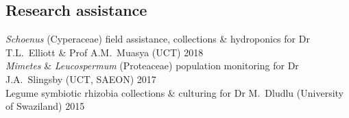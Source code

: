 \documentclass[10pt]{article}
\begin{document}
\subsection*{Research assistance} %

\textit{Schoenus} (Cyperaceae)
  field assistance, collections \& hydroponics
  for Dr T.L.~Elliott \& Prof A.M.~Muasya
  {\small (UCT)}                                         \hfill {\small 2018} \\
\textit{Mimetes} \& \textit{Leucospermum} (Proteaceae)
  population monitoring
  for Dr J.A.~Slingsby
  {\small (UCT, SAEON)}                                  \hfill {\small 2017} \\
Legume symbiotic rhizobia
  collections \& culturing
  for Dr M.~Dludlu
  {\small (University of Swaziland)}                     \hfill {\small 2015}
\end{document}
